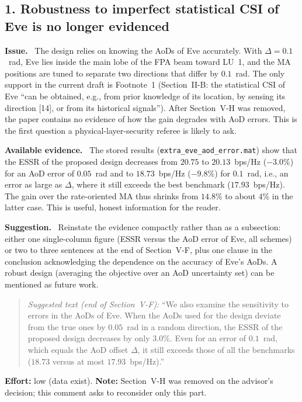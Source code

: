 \documentclass[10.5pt,a4paper]{article}
\newcommand{\Major}{\textcolor{BrickRed}{\textbf{Major}}}
\newcommand{\comment}[3]{\subsection*{#1}\vspace{-4pt}{\small Severity: #2\qquad Category: #3}\par}
\newenvironment{field}[1]{\par\smallskip\textbf{#1}\ }{\par}
\newenvironment{example}{\begin{quote}\small}{\end{quote}}
\begin{document}
\comment{1. Robustness to imperfect statistical CSI of Eve is no longer evidenced}{\Major}{Simulation, assumptions}
\begin{field}{Issue.}
The design relies on knowing the AoDs of Eve accurately. With $\Delta=0.1$~rad, Eve lies inside the main lobe of the FPA beam toward LU~1, and the MA positions are tuned to separate two directions that differ by $0.1$~rad. The only support in the current draft is Footnote~1 (Section~II-B: the statistical CSI of Eve ``can be obtained, e.g., from prior knowledge of its location, by sensing its direction [14], or from its historical signals''). After Section~V-H was removed, the paper contains no evidence of how the gain degrades with AoD errors. This is the first question a physical-layer-security referee is likely to ask.
\end{field}
\begin{field}{Available evidence.}
The stored results (\texttt{extra\_eve\_aod\_error.mat}) show that the ESSR of the proposed design decreases from $20.75$ to $20.13$~bps/Hz ($-3.0\%$) for an AoD error of $0.05$~rad and to $18.73$~bps/Hz ($-9.8\%$) for $0.1$~rad, i.e., an error as large as $\Delta$, where it still exceeds the best benchmark ($17.93$~bps/Hz). The gain over the rate-oriented MA thus shrinks from $14.8\%$ to about $4\%$ in the latter case. This is useful, honest information for the reader.
\end{field}
\begin{field}{Suggestion.}
Reinstate the evidence compactly rather than as a subsection: either one single-column figure (ESSR versus the AoD error of Eve, all schemes) or two to three sentences at the end of Section~V-F, plus one clause in the conclusion acknowledging the dependence on the accuracy of Eve's AoDs. A robust design (averaging the objective over an AoD uncertainty set) can be mentioned as future work.
\end{field}
\begin{example}
\textit{Suggested text (end of Section~V-F):} ``We also examine the sensitivity to errors in the AoDs of Eve. When the AoDs used for the design deviate from the true ones by $0.05$~rad in a random direction, the ESSR of the proposed design decreases by only $3.0\%$. Even for an error of $0.1$~rad, which equals the AoD offset $\Delta$, it still exceeds those of all the benchmarks ($18.73$ versus at most $17.93$~bps/Hz).''
\end{example}
\textbf{Effort:} low (data exist). \textbf{Note:} Section~V-H was removed on the advisor's decision; this comment asks to reconsider only this part.
\end{document}
